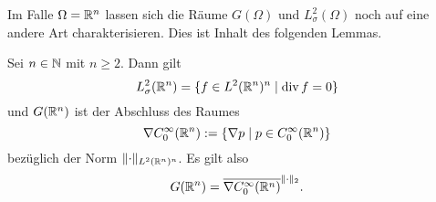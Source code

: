 Im Falle $\Omega = \mathbb{R}^n$ lassen sich die Räume $G(\Omega)$ und $L_\sigma^2(\Omega)$ noch auf eine andere Art charakterisieren.
Dies ist Inhalt des folgenden Lemmas.

\begin{thm}
  Sei $n \in \mathbb{N}$ mit $n \geq 2$.
  Dann gilt
  \begin{equation}
    \label{eq:LCharacterization}
    L_\sigma^2(\mathbb{R}^n) = \{ f \in L^2(\mathbb{R}^n)^n \mid \mathrm{div\,} f = 0 \}
  \end{equation}
  und $G(\mathbb{R}^n)$ ist der Abschluss des Raumes
  $$
  \nabla C_0^\infty(\mathbb{R}^n) := \{ \nabla p \mid p \in C_0^\infty(\mathbb{R}^n) \}
  $$
  bezüglich der Norm $\lVert \cdot \rVert_{L^2(\mathbb{R}^n)^n}$.
  Es gilt also
  \begin{equation}
    \label{eq:GCharacterization}
    G(\mathbb{R}^n) = \overline{\nabla C_0^\infty(\mathbb{R}^n)}^{\lVert \cdot \rVert_2}.
  \end{equation}
\end{thm}


